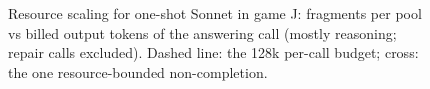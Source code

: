 \begin{figure}[t]\centering

\caption{Resource scaling for one-shot Sonnet in game J: fragments per pool vs billed output tokens of the answering call (mostly reasoning; repair calls excluded). Dashed line: the 128k per-call budget; cross: the one resource-bounded non-completion.}
\label{fig:10}
\end{figure}
